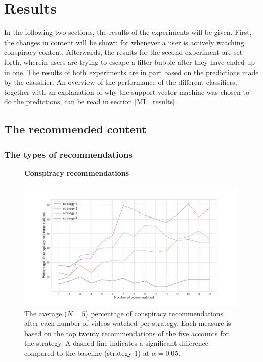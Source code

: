 \documentclass[../main.tex]{subfiles}
\begin{document}
\section{Results}
In the following two sections, the results of the experiments will be given. First, the changes in content 
will be shown for whenever a user is actively watching conspiracy content. Afterwards, the results for the
second experiment are set forth, wherein users are trying to escape a filter bubble after they have ended 
up in one. The results of both experiments are in part based on the predictions made by the classifier. An 
overview of the performance of the different classifiers, together with an explanation of why the 
support-vector machine was chosen to do the predictions, can be read in section \ref{ML_results}.

\subsection{The recommended content}
\subsubsection{The types of recommendations}
\begin{figure}[h]
  \textbf{Conspiracy recommendations}\par\medskip
  \centering
  \includegraphics[keepaspectratio, width=\textwidth]{images/conspiracy_recs.pdf}
  \caption[]{The average ($N=5$) percentage of conspiracy recommendations after each number of videos watched per strategy. Each measure is based on the top twenty recommendations of the five accounts for the strategy. A dashed line indicates a significant difference compared to the baseline (strategy 1) at $\alpha = 0.05$.\footnotemark}
  \label{fig:con_recs}
\end{figure}
\end{document}

